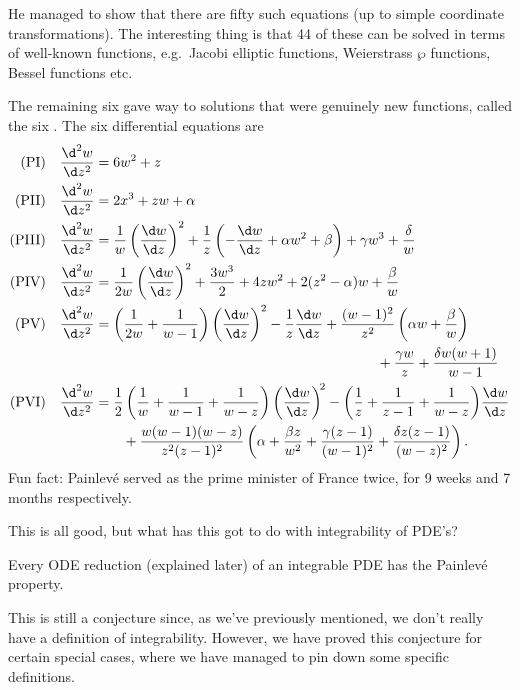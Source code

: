 \documentclass[a4paper]{article}
\begin{document}
He managed to show that there are fifty such equations (up to simple coordinate transformations). The interesting thing is that 44 of these can be solved in terms of well-known functions, e.g.\ Jacobi elliptic functions, Weierstrass $\wp$ functions, Bessel functions etc.

The remaining six gave way to solutions that were genuinely new functions, called the six . The six differential equations are
\begin{align*}
  \text{(PI)}\quad\frac{\d^2 w}{\d z^2} &= 6 w^2 + z\\
  \text{(PII)}\quad\frac{\d^2 w}{\d z^2} &= 2x^3 + zw + \alpha\\
  \text{(PIII)}\quad\frac{\d^2 w}{\d z^2} &= \frac{1}{w}\left(\frac{\d w}{\d z}\right)^2 + \frac{1}{z}\left(-\frac{\d w}{\d z} + \alpha w^2 + \beta\right) + \gamma w^3 + \frac{\delta}{w}\\
  \text{(PIV)}\quad\frac{\d^2 w}{\d z^2} &= \frac{1}{2w}\left(\frac{\d w}{\d z}\right)^2 + \frac{3 w^3}{2} + 4zw^2 + 2(z^2 - \alpha) w + \frac{\beta}{w}\\
  \text{(PV)}\quad\frac{\d^2 w}{\d z^2} &= \left(\frac{1}{2w} + \frac{1}{w - 1}\right) \left(\frac{\d w}{\d z}\right)^2 - \frac{1}{z} \frac{\d w}{\d z} + \frac{(w - 1)^2}{z^2}\left(\alpha w + \frac{\beta}{w}\right) \\
  &\hphantom{\left(\frac{1}{2w} + \frac{1}{w - 1}\right) \left(\frac{\d w}{\d z}\right)^2 - \frac{1}{z} \frac{\d w}{\d z} + \frac{(w - 1)^2}{z^2}}+ \frac{\gamma w}{z} + \frac{\delta w(w + 1)}{w - 1}\\
  \text{(PVI)}\quad\frac{\d^2 w}{\d z^2} &= \frac{1}{2}\left(\frac{1}{w} + \frac{1}{w - 1} + \frac{1}{w - z}\right)\left(\frac{\d w}{\d z}\right)^{\!2} - \left(\frac{1}{z} + \frac{1}{z - 1} + \frac{1}{w - z}\right)\!\frac{\d w}{\d z}\\
  &\quad\quad+ \frac{w(w - 1)(w - z)}{z^2 (z - 1)^2} \left(\alpha + \frac{\beta z}{w^2} + \frac{\gamma (z - 1)}{(w - 1)^2} + \frac{\delta z(z - 1)}{(w - z)^2}\right).
\end{align*}
Fun fact: Painlev\'e served as the prime minister of France twice, for 9 weeks and 7 months respectively.

This is all good, but what has this got to do with integrability of PDE's?

\begin{conjecture}
  Every ODE reduction (explained later) of an integrable PDE has the Painlev\'e property.
\end{conjecture}
This is still a conjecture since, as we've previously mentioned, we don't really have a definition of integrability. However, we have proved this conjecture for certain special cases, where we have managed to pin down some specific definitions.
\end{document}
